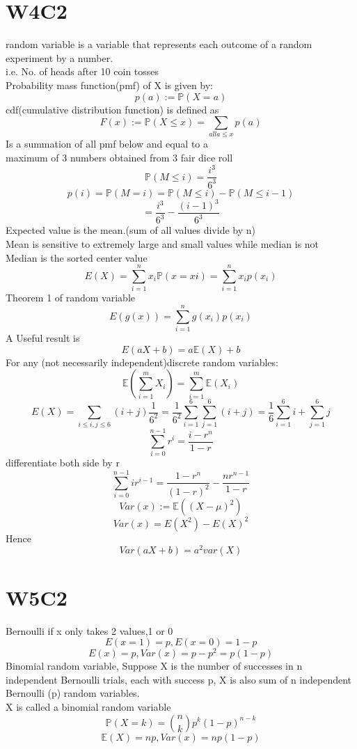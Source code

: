 \documentclass{article}
\begin{document}
\section{W4C2}
random variable is a variable that represents each outcome of a random experiment by a number.\\
i.e. No. of heads after 10 coin tosses\\
Probability mass function(pmf) of X is given by:
$$
p(a):=\mathbb P(X=a)
$$
cdf(cumulative distribution function) is defined as\\
$$
F(x):=\mathbb{P}(X\leq x)=\sum_{all a\leq x}p(a)
$$
Is a summation of all pmf below and equal to a\\
maximum of 3 numbers obtained from 3 fair dice roll
$$
\mathbb{P}(M\leq i)=\frac{i^3}{6^3}
$$
$$
p(i)=\mathbb{P}(M=i)=\mathbb{P}(M\leq i)-\mathbb{P}(M\leq i-1)
$$
$$
=\frac{i^3}{6^3}-\frac{(i-1)^3}{6^3}
$$
Expected value is the mean.(sum of all values divide by n)\\
Mean is sensitive to extremely large and small values while median is not\\
Median is the sorted center value\\
$$
E(X)=\sum_{i=1}^n x_i\mathbb P(x=xi)=\sum_{i=1}^n x_ip(x_i)
$$
Theorem 1 of random variable\\
$$
E(g(x))=\sum_{i=1}^ng(x_i)p(x_i)
$$
A Useful result is
$$
E(aX+b)=a\mathbb E(X)+b
$$
For any (not necessarily independent)discrete random variables:
$$
\mathbb E(\sum_{i=1}^mX_i)=\sum_{i=1}^m\mathbb{E}(X_i)
$$
$$
E(X)=\sum_{i\leq i,j \leq 6}(i+j)\frac{1}{6^2}=\frac{1}{6^2}\sum_{i=1}^6\sum_{j=1}^6(i+j)=\frac{1}{6}\sum_{i=1}^6i+\sum_{j=1}^6j
$$
$$
\sum_{i=0}^{n-1}r^i=\frac{i-r^n}{1-r}
$$
differentiate both side by r
$$
\sum_{i=0}^{n-1}ir^{i-1}=\frac{1-r^n}{(1-r)^2}-\frac{nr^{n-1}}{1-r}
$$
$$
Var(x):=\mathbb{E}((X-\mu)^2)
$$
$$
Var(x)=E(X^2)-E(X)^2
$$
Hence
$$
Var(aX+b)=a^2var(X)
$$
\section{W5C2}
Bernoulli if x only takes 2 values,1 or 0
$$
E(x=1)=p,E(x=0)=1-p
$$
$$
E(x)=p, Var(x)=p-p^2=p(1-p)
$$
Binomial random variable, Suppose X is the number of successes in n independent Bernoulli trials, each with success p, X is also sum of n independent Bernoulli (p) random variables.\\

X is called a binomial random variable
$$
\mathbb{P}(X=k)={n \choose k}p^k(1-p)^{n-k}
$$
$$
\mathbb{E}(X)=np, Var(x)=np(1-p)
$$
\end{document}
